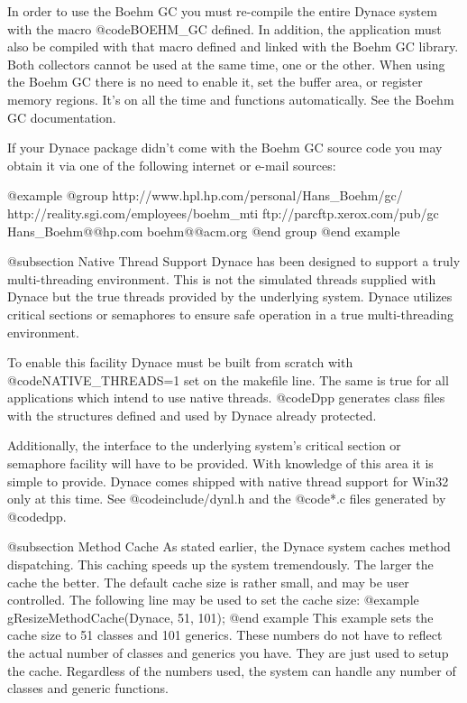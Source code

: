 In order to use the Boehm GC you must re-compile the entire Dynace
system with the macro @code{BOEHM_GC} defined.  In addition, the
application must also be compiled with that macro defined and linked
with the Boehm GC library.  Both collectors cannot be used at the same
time, one or the other.  When using the Boehm GC there is no need to
enable it, set the buffer area, or register memory regions.  It's on all
the time and functions automatically.  See the Boehm GC documentation.

If your Dynace package didn't come with the Boehm GC source code you
may obtain it via one of the following internet or e-mail sources:

@example
@group
http://www.hpl.hp.com/personal/Hans_Boehm/gc/
http://reality.sgi.com/employees/boehm_mti
ftp://parcftp.xerox.com/pub/gc
Hans_Boehm@@hp.com
boehm@@acm.org
@end group
@end example



@subsection Native Thread Support
Dynace has been designed to support a truly multi-threading
environment.  This is not the simulated threads supplied with Dynace
but the true threads provided by the underlying system.  Dynace
utilizes critical sections or semaphores to ensure safe operation
in a true multi-threading environment.

To enable this facility Dynace must be built from scratch with
@code{NATIVE_THREADS=1} set on the makefile line.  The same is
true for all applications which intend to use native threads.
@code{Dpp} generates class files with the structures defined
and used by Dynace already protected.

Additionally, the interface to the underlying system's critical
section or semaphore facility will have to be provided.  With
knowledge of this area it is simple to provide.  Dynace comes
shipped with native thread support for Win32 only at this time.
See @code{include/dynl.h} and the @code{*.c} files generated by
@code{dpp}.



@subsection Method Cache
As stated earlier, the Dynace system caches method dispatching.  This
caching speeds up the system tremendously.  The larger the cache the
better.  The default cache size is rather small, and may be user
controlled.  The following line may be used to set the cache size:
@example
        gResizeMethodCache(Dynace, 51, 101);
@end example
This example sets the cache size to 51 classes and 101 generics.  These
numbers do not have to reflect the actual number of classes and generics
you have.  They are just used to setup the cache.  Regardless of the
numbers used, the system can handle any number of classes and generic
functions.

